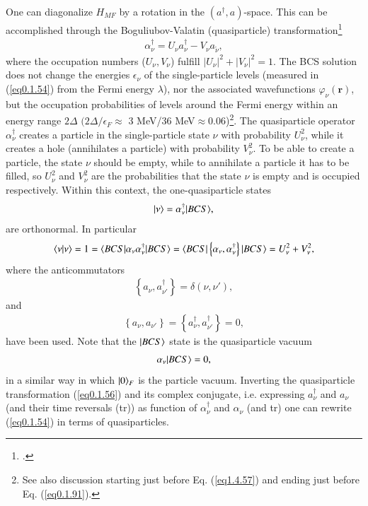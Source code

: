 One can diagonalize $H_{MF}$ by a rotation in the $(a^\dagger,a)$-space. This can be accomplished through the Boguliubov-Valatin (quasiparticle) transformation\footnote{\cite{Bogoljubov:58,Bogoljubov:58b,Valatin:58}.}
\begin{align}\label{eq0.1.56}
\alpha^\dagger_\nu=U_\nu a^\dagger_\nu-V_\nu a_{\tilde\nu},
\end{align}
where the occupation numbers ($U_\nu,V_\nu$) fulfill $|U_\nu|^2+|V_\nu|^2=1$.
The BCS solution does not change the energies $\epsilon_\nu$ of the single-particle levels (measured in (\ref{eq0.1.54}) from the Fermi energy $\lambda$), nor the associated wavefunctions $\varphi_{\nu}(\mathbf r)$, but the occupation probabilities of levels around the Fermi energy within an energy range $2\Delta$ $(2\Delta/\epsilon_F\approx$ 3 MeV/36 MeV$\approx0.06$)\footnote{See also discussion starting just before Eq. (\ref{eq1.4.57}) and ending just before Eq. (\ref{eq0.1.91}).}. The quasiparticle operator $\alpha^\dagger_\nu$ creates a particle in the single-particle state $\nu$ with probability $U^2_\nu$, while it creates a hole (annihilates a particle) with probability $V^2_\nu$. To be able to create a particle, the state $\nu$ should be empty, while to annihilate a particle it has to be filled, so $U^2_\nu$ and $V^2_\nu$ are the probabilities  that the state $\nu$ is empty and is occupied respectively. Within this context, the one-quasiparticle states   
\begin{align}\label{eq0.1.57}
|{\nu} \rangle=\alpha^\dagger_\nu|{BCS} \rangle,
\end{align}
are orthonormal. In particular
\begin{align}\label{eq0.1.58}
\langle {\nu|\nu} \rangle=1=\langle {BCS|\alpha_{\nu}\alpha^\dagger_\nu|BCS} \rangle=\langle {BCS|\left\{\alpha_{\nu},\alpha^\dagger_\nu\right\}|BCS} \rangle=U^2_\nu+V^2_\nu,
\end{align}
where the anticommutators
\begin{align}\label{eq0.1.59}
\left\{a_{\nu},a^\dagger_{\nu'}\right\}=\delta(\nu,\nu'),
\end{align}
and
\begin{align}\label{eq0.1.60}
\left\{a_{\nu},a_{\nu'}\right\}=\left\{a^\dagger_{\nu},a^\dagger_{\nu'}\right\}=0,
\end{align}
have been used. Note that the $|{BCS} \rangle$ state is the quasiparticle vacuum
\begin{align}\label{eq0.1.61}
\alpha_\nu|{BCS} \rangle=0,
\end{align}
in a similar way in which $|{0} \rangle_F$ is the particle vacuum. Inverting the quasiparticle transformation (\ref{eq0.1.56}) and its complex conjugate, i.e. expressing $a_\nu^\dagger$ and $a_\nu$ (and their time reversals (tr)) as function of $\alpha^\dagger_\nu$ and $\alpha_\nu$ (and tr) one can rewrite (\ref{eq0.1.54}) in terms of quasiparticles.

